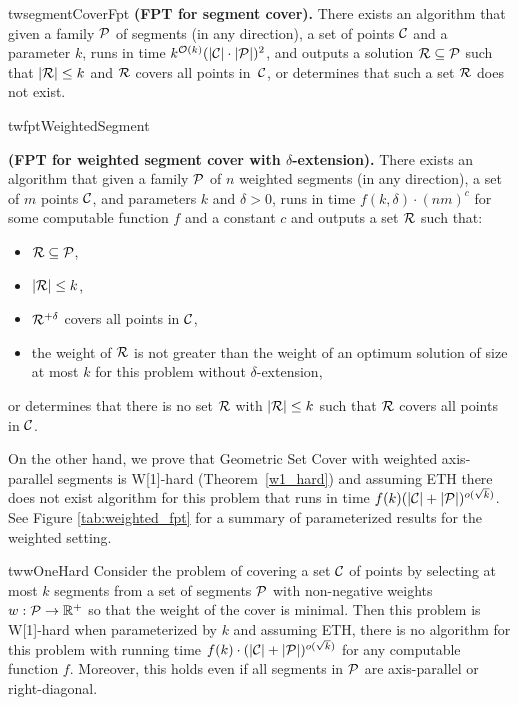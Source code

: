\begin{restatable}{tw}{segmentCoverFpt}{
	\label{segment_cover_fpt}
	\textbf{(FPT for segment cover).}
	There exists an algorithm that given a family $\mathcal{P}$ of
	segments (in any direction),
	a set of points $\mathcal{C}$
	and a parameter $k$,
	runs in time ${k^{\mathcal{O}(k)} (|\mathcal{C}|\cdot|\mathcal{P}|)^2}$,
	and outputs a solution $\mathcal{R} \subseteq \mathcal{P}$
	such that $|\mathcal{R}| \le k$ and $\mathcal{R}$ covers all points in~$\mathcal{C}$,
	or determines that such a set $\mathcal{R}$ does not exist.
}\end{restatable}

\begin{restatable}{tw}{fptWeightedSegment}{
	\label{fpt_weighted_segment}
	\textbf{(FPT for weighted segment cover with $\delta$-extension).}
	There exists an algorithm that given a family $\mathcal{P}$ of
	$n$ weighted segments (in any direction),
	a set of $m$ points $\mathcal{C}$, and parameters $k$ and $\delta > 0$,
	runs in time $f(k, \delta) \cdot (nm)^c$ for some computable function $f$ and a constant $c$ and
	outputs a set $\mathcal{R}$ such that:
	\begin{itemize}
	\item $\mathcal{R} \subseteq \mathcal{P}$,
	\item $|\mathcal{R}| \le k$,
	\item $\mathcal{R}^{+\delta}$ covers all points in $\mathcal{C}$,
	\item the weight of $\mathcal{R}$ is not greater than the weight
	of an optimum solution of size at most $k$
	for this problem without $\delta$-extension,
	\end{itemize}
	or determines that there is no set $\mathcal{R}$ with $|\mathcal{R}| \le k$
	such that $\mathcal{R}$ covers all points in $\mathcal{C}$.
}\end{restatable}

On the other hand, we prove that Geometric Set Cover with weighted
axis-parallel segments is W[1]-hard (Theorem~\ref{w1_hard})
and assuming ETH there does not exist algorithm for this problem
that runs in time ${f(k)(|\mathcal{C}| + |\mathcal{P}|)^{o(\sqrt{k})}}$.
See Figure \ref{tab:weighted_fpt} for a summary of parameterized
results for the weighted setting.

\begin{restatable}{tw}{wOneHard}
\label{w1_hard}
	Consider the problem of covering a set $\mathcal{C}$ of points
	by selecting at most $k$ segments
	from a set of segments $\mathcal{P}$ 
	with non-negative weights $w : \mathcal{P} \rightarrow \mathbb{R^+}$
	so that the weight of the cover is minimal.
	Then this problem is W[1]-hard when parameterized by $k$ and
	assuming ETH, there is no algorithm for this
	problem with running time
	$f(k)\cdot(|\mathcal{C}| + |\mathcal{P}|)^{o(\sqrt{k})}$
	for any computable function $f$.
	Moreover, this holds even if all segments in $\mathcal{P}$
	are axis-parallel or right-diagonal.
\end{restatable}

